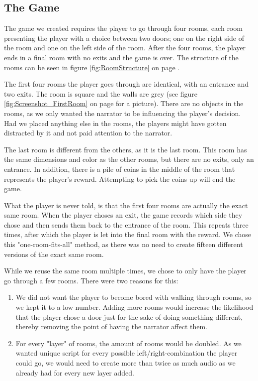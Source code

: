 \subsection{The Game}
\label{Method_Game}

The game we created requires the player to go through four rooms, each room presenting the player with a choice between two doors; one on the right side of the room and one on the left side of the room. After the four rooms, the player ends in a final room with no exits and the game is over. The structure of the rooms can be seen in figure \ref{fig:RoomStructure} on page \pageref{fig:RoomStructure}.


The first four rooms the player goes through are identical, with an entrance and two exits. The room is square and the walls are grey (see figure \ref{fig:Screenshot_FirstRoom} on page \pageref{fig:Screenshot_FirstRoom} for a picture). There are no objects in the rooms, as we only wanted the narrator to be influencing the player's decision. Had we placed anything else in the rooms, the players might have gotten distracted by it and not paid attention to the narrator.


The last room is different from the others, as it is the last room. This room has the same dimensions and color as the other rooms, but there are no exits, only an entrance. In addition, there is a pile of coins in the middle of the room that represents the player's reward. Attempting to pick the coins up will end the game.

What the player is never told, is that the first four rooms are actually the exact same room. When the player choses an exit, the game records which side they chose and then sends them back to the entrance of the room. This repeats three times, after which the player is let into the final room with the reward. We chose this "one-room-fits-all" method, as there was no need to create fifteen different versions of the exact same room.

While we reuse the same room multiple times, we chose to only have the player go through a few rooms. There were two reasons for this:
\begin{enumerate}
	\item We did not want the player to become bored with walking through rooms, so we kept it to a low number. Adding more rooms would increase the likelihood that the player chose a door just for the sake of doing something different, thereby removing the point of having the narrator affect them.
	\item For every "layer" of rooms, the amount of rooms would be doubled. As we wanted unique script for every possible left/right-combination the player could go, we would need to create more than twice as much audio as we already had for every new layer added.
\end{enumerate}

